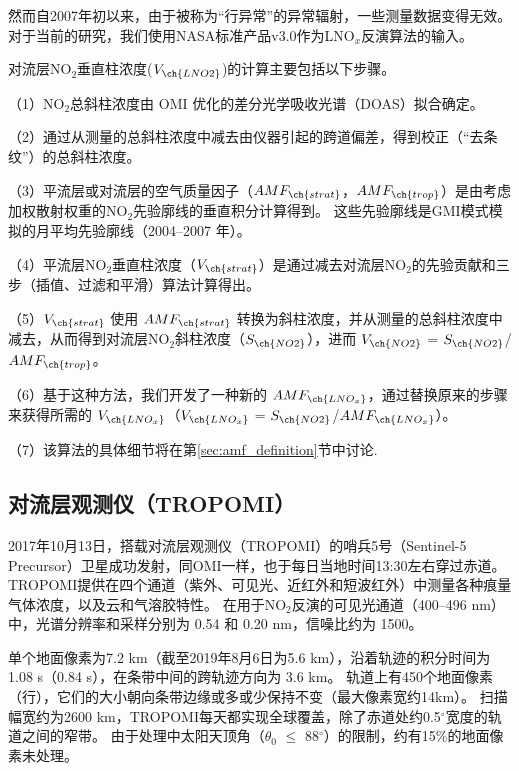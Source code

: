 然而自2007年初以来，由于被称为“行异常”的异常辐射\citep{Dobber.2008}，一些测量数据变得无效。
对于当前的研究，我们使用NASA标准产品v3.0\citep{Krotkov.2017}作为LNO$_x$反演算法的输入。

对流层NO$_2$垂直柱浓度($V_{\ch{LNO2}}$)的计算主要包括以下步骤。

（1）NO$_2$总斜柱浓度由 OMI 优化的差分光学吸收光谱（DOAS）拟合确定。

（2）通过从测量的总斜柱浓度中减去由仪器引起的跨道偏差，得到校正（“去条纹”）的总斜柱浓度。

（3）平流层或对流层的空气质量因子（$AMF_{\ch{strat}}$，$AMF_{\ch{trop}}$）是由考虑加权散射权重的NO$_2$先验廓线的垂直积分计算得到。
这些先验廓线是GMI模式模拟的月平均先验廓线（2004--2007 年）。

（4）平流层NO$_2$垂直柱浓度（$V_{\ch{strat}}$）是通过减去对流层NO$_2$的先验贡献和三步（插值、过滤和平滑）算法计算得出\citep{Bucsela.2013}。

（5）$V_{\ch{strat}}$ 使用 $AMF_{\ch{strat}}$ 转换为斜柱浓度，并从测量的总斜柱浓度中减去，从而得到对流层NO$_2$斜柱浓度（$S_{\ch{NO2}}$），进而 $V_{\ch{NO2}}$ = $S_{\ch{NO2}}$/$AMF_{\ch{trop}}$。

（6）基于这种方法，我们开发了一种新的 $AMF_{\ch{LNO_x}}$，通过替换原来的步骤来获得所需的 $V_{\ch{LNO_x}}$（$V_{\ch{LNO_x}}$ = $S_{\ch{NO2}}$/$AMF_{\ch{LNO_x}}$）。

（7）该算法的具体细节将在第\ref{sec:amf_definition}节中讨论.

\subsection{对流层观测仪（TROPOMI）}

2017年10月13日，搭载对流层观测仪（TROPOMI）的哨兵5号（Sentinel-5 Precursor）卫星成功发射\citep{Veefkind.2012}，同OMI一样，也于每日当地时间13:30左右穿过赤道。
TROPOMI提供在四个通道（紫外、可见光、近红外和短波红外）中测量各种痕量气体浓度，以及云和气溶胶特性。
在用于NO$_2$反演的可见光通道（400–496 nm）中，光谱分辨率和采样分别为 0.54 和 0.20 nm，信噪比约为 1500。

单个地面像素为7.2 km（截至2019年8月6日为5.6 km），沿着轨迹的积分时间为1.08 s（0.84 s），在条带中间的跨轨迹方向为 3.6 km。
轨道上有450个地面像素（行），它们的大小朝向条带边缘或多或少保持不变（最大像素宽约14km）。
扫描幅宽约为2600 km，TROPOMI每天都实现全球覆盖，除了赤道处约0.5$^{\circ}$宽度的轨道之间的窄带。
由于处理中太阳天顶角（$\theta_0$ $\leq$ 88$^{\circ}$）的限制，约有15\%的地面像素未处理。

